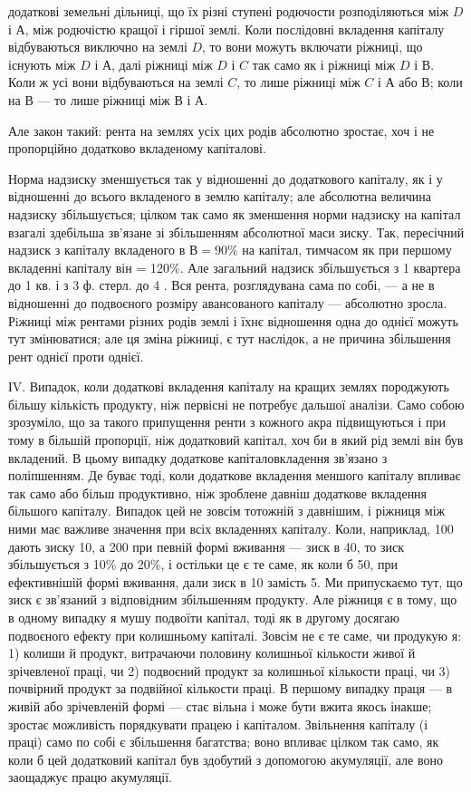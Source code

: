 \parcont{}  %
додаткові земельні дільниці, що їх різні ступені родючости розподіляються між
$D$ і $А$, між родючістю кращої і гіршої землі. Коли послідовні вкладення капіталу
відбуваються виключно на землі $D$, то вони можуть включати ріжниці, що
існують між $D$ і $А$, далі ріжниці між $D$ і $C$ так само як і ріжниці між $D$ і $В$.
Коли ж усі вони відбуваються на землі $C$, то лише ріжниці між $C$ і $А$ або $В$;
коли на $В$ — то лише ріжниці між $В$ і $А$.

Але закон такий: рента на землях усіх цих родів абсолютно зростає, хоч
і не пропорційно додатково вкладеному капіталові.

Норма надзиску зменшується так у відношенні до додаткового капіталу,
як і у відношенні до всього вкладеного в землю капіталу; але абсолютна величина
надзиску збільшується; цілком так само як зменшення норми надзиску
на капітал взагалі здебільша зв’язане зі збільшенням абсолютної маси зиску.
Так, пересічний надзиск з капіталу вкладеного в $В = 90\%$ на капітал, тимчасом
як при першому вкладенні капіталу він = 120\%. Але загальний надзиск
збільшується з 1 квартера до 1 кв. і з 3 ф. стерл. до 4 . Вся рента,
розглядувана сама по собі, — а не в відношенні до подвоєного розміру авансованого
капіталу — абсолютно зросла. Рiжниці між рентами різних родів землі і
їхнє відношення одна до однієї можуть тут змінюватися; але ця зміна ріжниці,
є тут наслідок, а не причина збільшення рент однієї проти однієї.

ІV. Випадок, коли додаткові вкладення капіталу на кращих землях породжують
більшу кількість продукту, ніж первісні не потребує дальшої аналізи.
Само собою зрозуміло, що за такого припущення ренти з кожного
акра підвищуються і при тому в більшій пропорції, ніж додатковий капітал,
хоч би в який рід землі він був вкладений. В цьому випадку додаткове
капіталовкладення зв’язано з поліпшенням. Де буває тоді, коли додаткове
вкладення меншого капіталу впливає так само або більш продуктивно, ніж зроблене
давніш додаткове вкладення більшого капіталу. Випадок цей не зовсім тотожній
з давнішим, і ріжниця між ними має важливе значення при всіх
вкладеннях капіталу. Коли, наприклад, 100 дають зиску 10, а 200 при певній
формі вживання — зиск в 40, то зиск збільшується з 10\% до 20\%, і остільки
це є те саме, як коли б 50, при ефективнішій формі вживання, дали зиск в 10
замість 5. Ми припускаємо тут, що зиск є зв’язаний з відповідним збільшенням
продукту. Але ріжниця є в тому, що в одному випадку я мушу подвоїти капітал,
тоді як в другому досягаю подвоєного ефекту при колишньому капіталі.
Зовсім не є те саме, чи продукую я: 1) колиши й продукт, витрачаючи половину
колишньої кількости живої й зрічевленої праці, чи 2) подвоєний продукт
за колишньої кількости праці, чи 3) почвірний продукт за подвійної кількости
праці. В першому випадку праця — в живій або зрічевленій формі — стає вільна
і може бути вжита якось інакше; зростає можливість порядкувати працею
і капіталом. Звільнення капіталу (і праці) само по собі є збільшення багатства;
воно впливає цілком так само, як коли б цей додатковий капітал був здобутий
з допомогою акумуляції, але воно заощаджує працю акумуляції.

